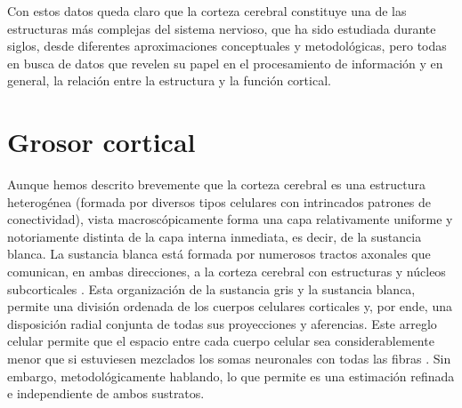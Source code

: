 

Con estos datos queda claro que la corteza cerebral constituye una de las estructuras más complejas del
sistema nervioso, que ha sido estudiada durante siglos, desde diferentes aproximaciones conceptuales
y metodológicas, pero todas en busca de datos que revelen su papel en el procesamiento de información
y en general, la relación entre la estructura y la función cortical.



\section{Grosor cortical}

Aunque hemos descrito brevemente que la corteza cerebral es una estructura heterogénea (formada por
diversos tipos celulares con intrincados patrones de conectividad), vista macroscópicamente forma una capa relativamente uniforme y notoriamente distinta de la capa interna inmediata, es decir, de la
sustancia blanca. La sustancia blanca está formada por numerosos tractos axonales que comunican, en
ambas direcciones, a la corteza cerebral con estructuras y núcleos subcorticales \cite{brodal_1981}. Esta
organización de la sustancia gris y la sustancia blanca, permite una división ordenada de los cuerpos
celulares corticales y, por ende, una disposición radial conjunta de todas sus proyecciones y aferencias.
Este arreglo celular permite que el espacio entre cada cuerpo celular sea considerablemente menor que
si estuviesen mezclados los somas neuronales con todas las fibras \cite{Shipp_2007}. Sin embargo,
metodológicamente hablando, lo que permite es una estimación refinada e independiente de ambos
sustratos. 

